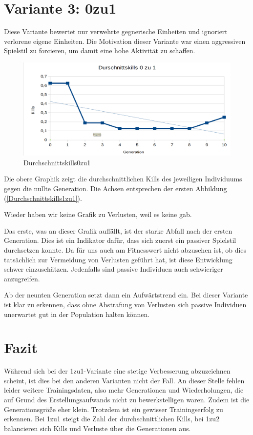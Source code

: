 \documentclass[
	12pt,
	a4paper,
	BCOR10mm,
	DIV14,
	headsepline,
	usegeometry,
]{scrreprt}
\begin{document}
\section{Variante 3: 0zu1}
Diese Variante bewertet nur verwehrte gegnerische Einheiten und ignoriert verlorene eigene Einheiten.
Die Motivation dieser Variante war einen aggressiven Spielstil zu forcieren, um damit eine hohe Aktivität zu schaffen.

\begin{figure}[h]
	\includegraphics[width = \textwidth]{Durchschnittskills0zu1.png}
	\caption{Durchschnittskills0zu1}
	\label{Durchschnittskills0zu1}
\end{figure}

Die obere Graphik zeigt die durchschnittlichen Kills des jeweiligen Individuums gegen die nullte Generation.
Die Achsen entsprechen der ersten Abbildung (\ref{Durchschnittskills1zu1}).

Wieder haben wir keine Grafik zu Verlusten, weil es keine gab.

Das erste, was an dieser Grafik auffällt, ist der starke Abfall nach der ersten Generation.
Dies ist ein Indikator dafür, dass sich zuerst ein passiver Spielstil durchsetzen konnte.
Da für uns auch am Fitnesswert nicht abzusehen ist, ob dies tatsächlich zur Vermeidung von Verlusten geführt hat, ist diese Entwicklung schwer einzuschätzen.
Jedenfalls sind passive Individuen auch schwieriger anzugreifen.

Ab der neunten Generation setzt dann ein Aufwärtstrend ein.
Bei dieser Variante ist klar zu erkennen, dass ohne Abstrafung von Verlusten sich passive Individuen unerwartet gut in der Population halten können.

\section{Fazit}
Während sich bei der 1zu1-Variante eine stetige Verbesserung abzuzeichnen scheint, ist dies bei den anderen Varianten nicht der Fall.
An dieser Stelle fehlen leider weitere Trainingsdaten, also mehr Generationen und Wiederholungen, die auf Grund des Erstellungsaufwands nicht zu bewerkstelligen waren.
Zudem ist die Generationsgröße eher klein.
Trotzdem ist ein gewisser Trainingserfolg zu erkennen.
Bei 1zu1 steigt die Zahl der durchschnittlichen Kills, bei 1zu2 balancieren sich Kills und Verluste über die Generationen aus.
\end{document}
